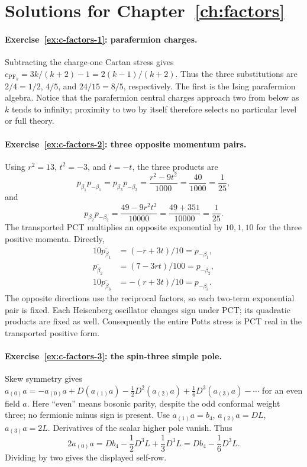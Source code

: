 \section{Solutions for Chapter~\ref{ch:factors}}

\paragraph{Exercise~\ref{ex:c-factors-1}: parafermion charges.}
\label{sol:ex:c-factors-1}
Subtracting the charge-one Cartan stress gives
$c_{\mathrm{PF}_k}=3k/(k+2)-1=2(k-1)/(k+2)$.
Thus the three substitutions are $2/4=1/2$,
$4/5$, and $24/15=8/5$, respectively.
The first is the Ising parafermion algebra. Notice that the
parafermion central charges approach two from below as $k$ tends
to infinity; proximity to two by itself therefore selects no
particular level or full theory.



\paragraph{Exercise~\ref{ex:c-factors-2}: three opposite momentum pairs.}
\label{sol:ex:c-factors-2}
Using $r^2=13$, $t^2=-3$, and $\overline t=-t$, the three products are
\[
 p_{\beta_1}p_{-\beta_1}
 =p_{\beta_3}p_{-\beta_3}
 =\frac{r^2-9t^2}{1000}
 =\frac{40}{1000}=\frac1{25},
\]
and
\[
 p_{\beta_2}p_{-\beta_2}
 =\frac{49-9r^2t^2}{10000}
 =\frac{49+351}{10000}=\frac1{25}.
\]
The transported PCT multiplies an opposite exponential by
$10,1,10$ for the three positive momenta. Directly,
\begin{align*}
 10\overline{p_{\beta_1}}&=(-r+3t)/10=p_{-\beta_1},\\
 \overline{p_{\beta_2}}&=(7-3rt)/100=p_{-\beta_2},\\
 10\overline{p_{\beta_3}}&=-(r+3t)/10=p_{-\beta_3}.
\end{align*}
The opposite directions use the reciprocal factors, so each
two-term exponential pair is fixed. Each Heisenberg oscillator
changes sign under PCT; its quadratic products are fixed as well.
Consequently the entire Potts stress is PCT real in the transported
positive form.



\paragraph{Exercise~\ref{ex:c-factors-3}: the spin-three simple pole.}
\label{sol:ex:c-factors-3}
Skew symmetry gives
$a_{(0)}a=-a_{(0)}a+D(a_{(1)}a)-\frac12D^2(a_{(2)}a)
+\frac16D^3(a_{(3)}a)-\cdots$ for an even field $a$.
Here ``even'' means bosonic parity, despite the odd conformal
weight three; no fermionic minus sign is present.
Use $a_{(1)}a=b_4$, $a_{(2)}a=DL$, $a_{(3)}a=2L$.
Derivatives of the scalar higher pole vanish. Thus
\[
 2a_{(0)}a=Db_4-\frac12D^3L+\frac13D^3L
            =Db_4-\frac16D^3L.
\]
Dividing by two gives the displayed self-row.



